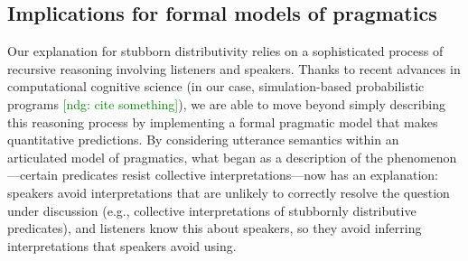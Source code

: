 \documentclass[preprint,12pt,authoryear,titlepage]{elsarticle}
\newcommand{\ndg}[1]{\textcolor{Green}{[ndg: #1]}}
\begin{document}



\subsection{Implications for formal models of pragmatics}


Our explanation for stubborn distributivity relies on a sophisticated process of recursive reasoning involving listeners and speakers. 
Thanks to recent advances in computational cognitive science (in our case, simulation-based probabilistic programs \ndg{cite something}), we are able to move beyond simply describing this reasoning process by implementing a formal pragmatic model that makes quantitative predictions. 
By considering utterance semantics within an articulated model of pragmatics, what began as a description of the phenomenon---certain predicates resist collective interpretations---now has an explanation: speakers avoid interpretations that are unlikely to correctly resolve the question under discussion (e.g., collective interpretations of stubbornly distributive predicates), and listeners know this about speakers, so they avoid inferring interpretations that speakers avoid using.
\end{document}
